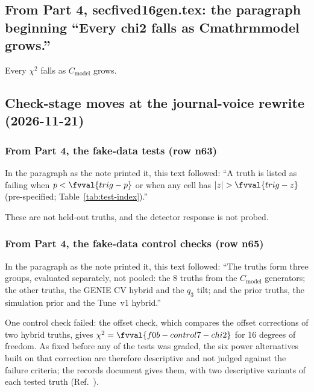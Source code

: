 \subsection{From Part 4, secfived16gen.tex: the paragraph beginning ``Every chi2 falls as Cmathrmmodel grows.''}
Every $\chi^2$ falls as $C_{\mathrm{model}}$ grows.

\subsection{Check-stage moves at the journal-voice rewrite (2026-11-21)}

\subsubsection{From Part 4, the fake-data tests (row n63)}
In the paragraph as the note printed it, this text followed: ``A truth is listed as failing when $p<\fvval{trig-p}$ or when any cell has $|z|>\fvval{trig-z}$ (pre-specified; Table~\ref{tab:test-index}).''\par
These are not held-out truths, and the detector response is not probed.

\subsubsection{From Part 4, the fake-data control checks (row n65)}
In the paragraph as the note printed it, this text followed: ``The truths form three groups, evaluated separately, not pooled: the 8 truths from the $C_{\mathrm{model}}$ generators; the other truths, the GENIE CV hybrid and the $q_3$ tilt; and the prior truths, the simulation prior and the Tune~v1 hybrid.''\par
One control check failed: the offset check, which compares the offset corrections of two hybrid truths, gives $\chi^2=\fvval{f0b-control7-chi2}$ for 16 degrees of freedom. As fixed before any of the tests was graded, the six power alternatives built on that correction are therefore descriptive and not judged against the failure criteria; the records document gives them, with two descriptive variants of each tested truth (Ref.~\cite{NoteRecords2026}).

